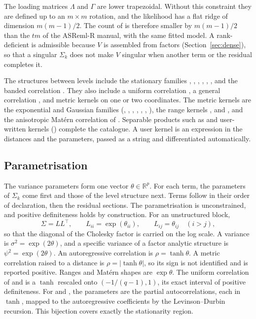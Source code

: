 \documentclass[article,nojss]{jss}
\renewcommand{\pkg}[1]{#1}
\begin{document}
The loading matrices $\Lambda$ and $\Gamma$ are lower trapezoidal. Without this
constraint they are defined up to an $m \times m$ rotation, and the
likelihood has a flat ridge of dimension $m(m-1)/2$. The count of 
is therefore smaller by $m(m-1)/2$ than the $tm$ of the \pkg{ASReml-R} manual,
with the same fitted model. A rank-deficient  is admissible because
$V$ is assembled from factors (Section~\ref{sec:dense}), so that a singular
$\Sigma_k$ does not make $V$ singular when another term or the residual
completes it.

The structures between levels include the stationary families ,
, , , , ,  and the
banded correlation . They also include a uniform correlation
, a general correlation , and metric kernels on one or two
coordinates. The metric kernels are the exponential and Gaussian families
(, , , , , ,
), the range kernels ,  and , and the
anisotropic Mat\'ern correlation of \citet{haskard2007}. Separable products
such as  and user-written kernels () complete
the catalogue. A user kernel is an expression in the distances and the
parameters, passed as a string and differentiated automatically.

\subsection{Parametrisation}\label{sec:param}

The variance parameters form one vector $\theta \in \mathbb{R}^p$. For each
term, the parameters of $\Sigma_k$ come first and those of the level
structure next. Terms follow in their order of declaration, then the
residual sections. The parametrisation is unconstrained, and positive
definiteness holds by construction. For an unstructured block,
\begin{equation}\label{eq:chol}
  \Sigma = LL^\top, \qquad L_{ii} = \exp(\theta_{ii}), \qquad L_{ij} =
  \theta_{ij} \quad (i > j),
\end{equation}
so that the diagonal of the Cholesky factor is carried on the log scale. A
variance is $\sigma^2 = \exp(2\theta)$, and a specific variance of a factor
analytic structure is $\psi^2 = \exp(2\theta)$. An autoregressive correlation
is $\rho = \tanh\theta$. A metric correlation raised to a distance is $\rho =
|\tanh\theta|$, so its sign is not identified and is reported positive. Ranges
and Mat\'ern shapes are $\exp\theta$. The uniform correlation of  and
 is a $\tanh$ rescaled onto $(-1/(q-1), 1)$, its exact interval of
positive definiteness. For  and , the parameters are the
partial autocorrelations, each in $\tanh$, mapped to the autoregressive
coefficients by the Levinson--Durbin recursion. This bijection
covers exactly the stationarity region.
\end{document}
